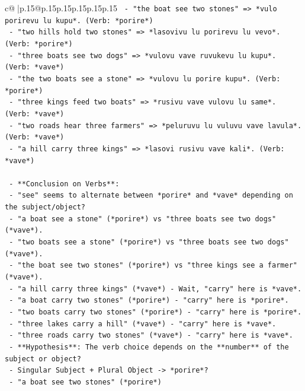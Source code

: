 \documentclass{article}
\begin{document}
{\begin{supertabular}{c@{$\;$}|p{.15\linewidth}@{}p{.15\linewidth}p{.15\linewidth}p{.15\linewidth}p{.15\linewidth}p{.15\linewidth}}
{{{\texttt{     {-} "the boat see two stones" => *vulo porirevu lu kupu*. (Verb: *porire*)} \\
\texttt{     {-} "two hills hold two stones" => *lasovivu lu porirevu lu vevo*. (Verb: *porire*)} \\
\texttt{     {-} "three boats see two dogs" => *vulovu vave ruvukevu lu kupu*. (Verb: *vave*)} \\
\texttt{     {-} "the two boats see a stone" => *vulovu lu porire kupu*. (Verb: *porire*)} \\
\texttt{     {-} "three kings feed two boats" => *rusivu vave vulovu lu same*. (Verb: *vave*)} \\
\texttt{     {-} "two roads hear three farmers" => *peluruvu lu vuluvu vave lavula*. (Verb: *vave*)} \\
\texttt{     {-} "a hill carry three kings" => *lasovi rusivu vave kali*. (Verb: *vave*)} \\
\\ 
\texttt{   {-} **Conclusion on Verbs**:} \\
\texttt{     {-} "see" seems to alternate between *porire* and *vave* depending on the subject/object?} \\
\texttt{       {-} "a boat see a stone" (*porire*) vs "three boats see two dogs" (*vave*).} \\
\texttt{       {-} "two boats see a stone" (*porire*) vs "three boats see two dogs" (*vave*).} \\
\texttt{       {-} "the boat see two stones" (*porire*) vs "three kings see a farmer" (*vave*).} \\
\texttt{       {-} "a hill carry three kings" (*vave*) {-} Wait, "carry" here is *vave*.} \\
\texttt{       {-} "a boat carry two stones" (*porire*) {-} "carry" here is *porire*.} \\
\texttt{       {-} "two boats carry two stones" (*porire*) {-} "carry" here is *porire*.} \\
\texttt{       {-} "three lakes carry a hill" (*vave*) {-} "carry" here is *vave*.} \\
\texttt{       {-} "three roads carry two stones" (*vave*) {-} "carry" here is *vave*.} \\
\texttt{     {-} **Hypothesis**: The verb choice depends on the **number** of the subject or object?} \\
\texttt{       {-} Singular Subject + Plural Object {-}> *porire*?} \\
\texttt{         {-} "a boat see two stones" (*porire*)} \\
}}}
\end{supertabular}}
\end{document}
